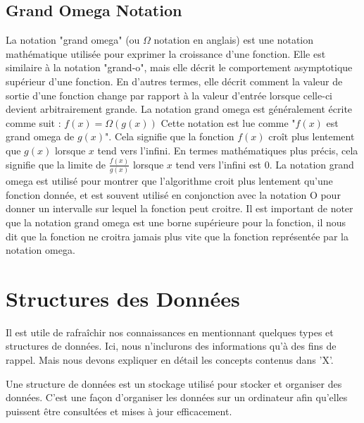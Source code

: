 \documentclass{article}
\begin{document}
   \subsection*{Grand Omega Notation}
    La notation "grand omega" (ou $\Omega$ notation en anglais) est une notation mathématique utilisée pour exprimer la croissance d'une fonction. Elle est similaire à la notation "grand-o", mais elle décrit le comportement asymptotique supérieur d'une fonction. En d'autres termes, elle décrit comment la valeur de sortie d'une fonction change par rapport à la valeur d'entrée lorsque celle-ci devient arbitrairement grande.
    La notation grand omega est généralement écrite comme suit :
    $f(x) = \Omega(g(x))$
    Cette notation est lue comme "$f(x)$ est grand omega de $g(x)$". Cela signifie que la fonction $f(x)$ croît plus lentement que $g(x)$ lorsque $x$ tend vers l'infini. En termes mathématiques plus précis, cela signifie que la limite de $\frac{f(x)}{g(x)}$ lorsque $x$ tend vers l'infini est $0$.
    La notation grand omega est utilisé pour montrer que l'algorithme croit plus lentement qu'une fonction donnée, et est souvent utilisé en conjonction avec la notation O pour donner un intervalle sur lequel la fonction peut croitre. Il est important de noter que la notation grand omega est une borne supérieure pour la fonction, il nous dit que la fonction ne croitra jamais plus vite que la fonction représentée par la notation omega.
    

        \newpage


    \tableofcontents
        
        
        \newpage
    

    
    \section{Structures des Données}

        Il est utile de rafraîchir nos connaissances en mentionnant quelques types et structures de données. Ici, nous n'inclurons des informations qu'à des fins de rappel. Mais nous devons expliquer en détail les concepts contenus dans 'X'.

        \begin{bclogo}[logo=\bcinfo, couleurBarre=black, noborder=true, couleur=white]{}

            Une structure de données est un stockage utilisé pour stocker et organiser des données. C'est une façon d'organiser les données sur un ordinateur afin qu'elles puissent être consultées et mises à jour efficacement.

        \end{bclogo}
\end{document}
